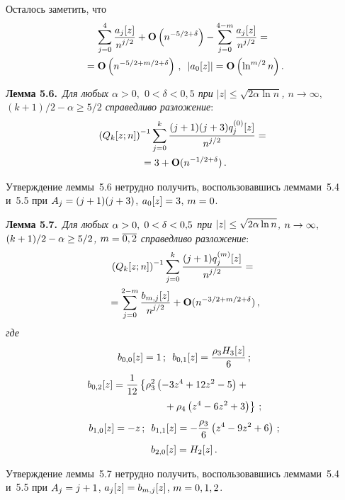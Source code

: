 \begin{multicols}{2}
 Осталось заметить, что
 \begin{multline*}
 \sum\limits_{j=0}^4 \displaystyle\frac{\displaystyle a_j[z]\mathstrut}{\displaystyle n^{j/2}\mathstrut}+\mathbf{O}\left(n^{-5/2+\delta}\right)
 - \sum\limits_{j=0}^{4-m} \displaystyle\frac{\displaystyle a_j[z]\mathstrut}{\displaystyle n^{j/2}\mathstrut}={}\\
 {}=\mathbf{O}\left(n^{-5/2+m/2+\delta}\right)\,,\enskip
 \left|a_0[z]\right|=\mathbf{O}\left(\ln^{m/2} n\right).
 \end{multline*}


\noindent
\textbf{Лемма 5.6.}\
\textit{Для любых $\alpha>0,$ $0<\delta<0{,}5$
 при $|z|\le \sqrt{2\alpha\ln n}$, $n\to \infty,$
 $(k+1)/2-\alpha\geq 5/2$ справедливо разложение}:
 \begin{multline*}
  \left(Q_k[z;n]\right)^{-1}\sum\limits_{j=0}^k \displaystyle\frac{\displaystyle (j+1)(j+3)q_j^{(0)}[z]\mathstrut}{\displaystyle n^{j/2}\mathstrut} ={}\\
  {}=
  3+\mathbf{O}(n^{-1/2+\delta})\,.
 \end{multline*}


 Утверждение леммы~5.6 нетрудно получить, воспользовавшись леммами~5.4 и~5.5
 при $A_j\hm=(j+1)(j+3)$, $a_0[z]\hm=3$, $m\hm=0$.

 \smallskip

\noindent
\textbf{Лемма 5.7.}\
\textit{Для любых $\alpha\hm>0,$ $0\hm<\delta\hm<0{,}5$
 при $|z|\hm\le \sqrt{2\alpha\ln n}$, $n\hm\to \infty,$
 $(k+1)/2\hm-\alpha\hm\geq 5/2$, $m\hm=\overline{0,2}$ справедливо разложение}:
 \begin{multline*}
  \left(Q_k[z;n]\right)^{-1}\sum\limits_{j=0}^k \displaystyle\frac{\displaystyle (j+1)q_j^{(m)}[z]\mathstrut}{\displaystyle n^{j/2}\mathstrut} ={}\\
  {}=
  \sum\limits_{j=0}^{2-m} \displaystyle\frac{\displaystyle b_{m,j}[z]\mathstrut}{\displaystyle n^{j/2}\mathstrut}+
  \mathbf{O}(n^{-3/2+m/2+\delta})\,,
 \end{multline*}
\textit{где}
 \begin{gather*}
 b_{0,0}[z]=1\,;\enskip  b_{0,1}[z]=\fr{\rho_3 H_3[z]}{6}\,;
\\
 \hspace*{-11mm}b_{0,2}[z]=   \fr{1}{12} \left\{\rho_3^2\left(-3z^4+12z^2-5\right)+{}\right.\\
 \left.\hspace*{20mm}{}+
  \rho_4\left(z^4-6z^2+3\right)\right\}\,;
\\
 b_{1,0}[z]=-z\,;\enskip
 b_{1,1}[z]=-\fr{\rho_3}{6}\left(z^4-9z^2+6\right)\,;\\
 b_{2,0}[z]=H_2[z]\,.
 \end{gather*}

 Утверждение леммы~5.7 нетрудно получить, воспользовавшись леммами~5.4 и~5.5 при
 $A_j\hm=j\hm+1$, $a_j[z]\hm=b_{m,j}[z]$,  $m\hm=0,1,2$.


\end{multicols}
